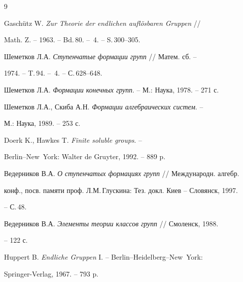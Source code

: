 \begin{thebibliography}{9}







Gasch\"{u}tz W. {\em Zur Theorie der endlichen aufl\"{o}sbaren Gruppen} //


Math. Z. -- 1963. -- Bd.\,80. -- \No\,4. -- S.\,300--305.




Шеметков Л.А. {\em Ступенчатые формации групп} // Матем. сб. --


1974. -- T.\,94. -- \No\,4. -- С.\,628--648.




Шеметков Л.А. {\em Формации конечных групп}. -- М.: Наука, 1978. -- 271 с.




Шеметков Л.А., Скиба А.Н. {\em Формации алгебраических систем}. --


М.: Наука, 1989. -- 253 с.




Doerk K., Hawkes T. {\em Finite soluble groups}. --


Berlin--New~York: Walter de Gruyter, 1992. -- 889 p.




Ведерников В.А. {\em О ступенчатых формациях групп} // Международн. алгебр.


конф., посв. памяти проф. Л.М.\,Глускина: Тез. докл. Киев -- Словянск, 1997.


-- С.\,48.




Ведерников В.А. {\em Элементы теории классов групп} // Смоленск, 1988.


-- 122 с.




Huppert B. {\em Endliche Gruppen} I. -- Berlin--Heidelberg--New~York:


Springer-Verlag, 1967. -- 793 p.





\end{thebibliography}





\vskip 2cm














\label{end}





